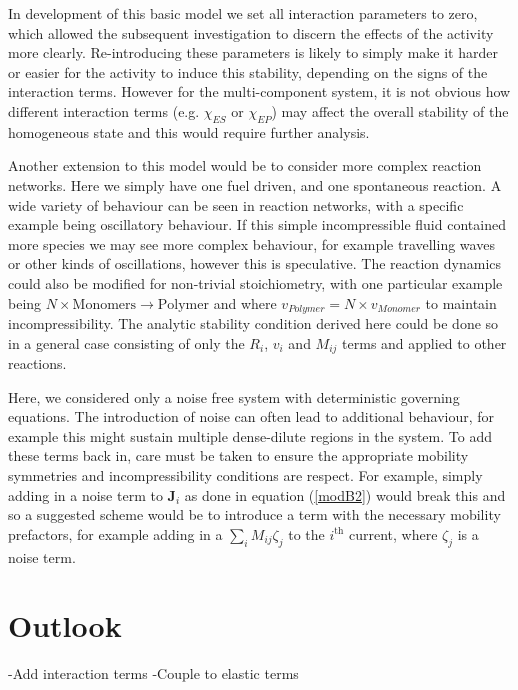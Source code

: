 In development of this basic model we set all interaction parameters to zero, which allowed the subsequent investigation to discern the effects of the activity more clearly. Re-introducing these parameters is likely to simply make it harder or easier for the activity to induce this stability, depending on the signs of the interaction terms. However for the multi-component system, it is not obvious how different interaction terms (e.g. $\chi_{ES}$  or $\chi_{EP}$) may affect the overall stability of the homogeneous state and this would require further analysis. 

Another extension to this model would be to consider more complex reaction networks. Here we simply have one fuel driven, and one spontaneous reaction. A wide variety of behaviour can be seen in reaction networks, with a specific example being oscillatory behaviour. If this simple incompressible fluid contained more species we may see more complex behaviour, for example travelling waves or other kinds of oscillations, however this is speculative. The reaction dynamics could also be modified for non-trivial stoichiometry, with one particular example being $N \times \text{Monomers} \rightarrow \text{Polymer}$ and where $v_{Polymer} = N \times v_{Monomer}$ to maintain incompressibility. The analytic stability condition derived here could be done so in a general case consisting of only the $R_i$, $v_i$ and $M_{ij}$ terms and applied to other reactions.

Here, we considered only a noise free system with deterministic governing equations. The introduction of noise can often lead to additional behaviour, for example this might sustain multiple dense-dilute regions in the system. To add these terms back in, care must be taken to ensure the appropriate mobility symmetries and incompressibility conditions are respect. For example, simply adding in a noise term to $\textbf{J}_i$ as done in equation (\ref{modB2}) would break this and so a suggested scheme would be to introduce a term with the necessary mobility prefactors, for example  adding in a $\sum_i M_{ij}\zeta_j$ to the $i^{\text{th}}$ current, where $\zeta_j$ is a noise term.

\section{Outlook}

-Add interaction terms
-Couple to elastic terms
